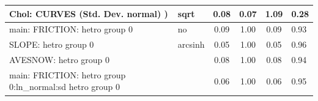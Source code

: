\begin{table}
\begin{center}
\begin{tabular}{|l|l|c|c|c|l|}
			\hline
			 Chol: CURVES (Std. Dev. normal) ) & sqrt & 0.08 & 0.07 & 1.09 & 0.28 \\
			\hline
			main: FRICTION: hetro group 0 & no & 0.09 & 1.00 & 0.09 & 0.93 \\
			\hline
			SLOPE: hetro group 0 & arcsinh & 0.05 & 1.00 & 0.05 & 0.96 \\
			\hline
			AVESNOW: hetro group 0 &  & 0.08 & 1.00 & 0.08 & 0.94 \\
			\hline
			main: FRICTION: hetro group 0:ln_normal:sd  hetro group 0 &  & 0.06 & 1.00 & 0.06 & 0.95 \\
			\hline
		\end{tabular}
	\end{center}
\end{table}
